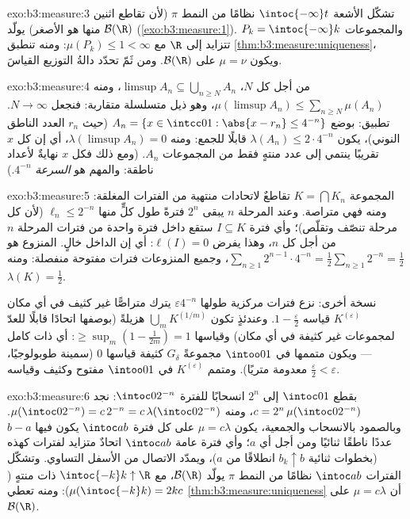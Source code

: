 \begin{solution}{exo:b3:measure:3}
تشكّل الأشعة $\intoc{-\infty}t$ نظامًا من النمط $\pi$ (لأن تقاطع اثنين منها
هو الأصغر) يولّد $\mathcal B(\R)$ (\cref{exo:b3:measure:1}). والمجموعات
$P_k = \intoc{-\infty}k$ تتزايد إلى $\R$ مع $\mu(P_k) \leq 1 < \infty$: ومنه تنطبق \cref{thm:b3:measure:uniqueness}، ويكون
$\mu = \nu$ على $\mathcal B(\R)$. ومن ثَمّ تحدّد دالةُ التوزيع
القياسَ.
\end{solution}

\begin{solution}{exo:b3:measure:4}
من أجل كل $N$، $\limsup A_n \subseteq \bigcup_{n \geq N}A_n$، ومنه $\mu(\limsup A_n) \leq \sum_{n\geq N}\mu(A_n)$، وهو ذيل متسلسلة متقاربة:
فنجعل $N \to \infty$. تطبيق: بوضع
$A_n = \{x \in \intcc01 : \abs{x - r_n} \leq 4^{-n}\}$
(حيث $r_n$ العدد الناطق النوني)، يكون $\lambda(A_n) \leq 2\cdot4^{-n}$ قابلًا للجمع:
ومنه $\lambda(\limsup A_n) = 0$، أي إن كل $x$ تقريبًا ينتمي إلى عدد منتهٍ فقط من
المجموعات $A_n$. (ومع ذلك فكل $x$ نهايةٌ لأعداد ناطقة: والمهم
هو \emph{السرعة} $4^{-n}$.)
\end{solution}

\begin{solution}{exo:b3:measure:5}
المجموعة $K = \bigcap K_n$ تقاطعٌ لاتحادات منتهية من الفترات المغلقة:
ومنه فهي متراصة. وعند المرحلة $n$ يبقى $2^n$ فترةً طول كلٍّ
منها $\ell_n \leq 2^{-n}$ (لأن كل مرحلة تنصّف وتقلّص)؛ وأي فترة
$I \subseteq K$ ستقع داخل فترة واحدة من فترات المرحلة $n$ من
أجل كل $n$، وهذا يفرض $\ell(I) = 0$: أي إن الداخل خالٍ. 
المنزوع هو $\sum_{n\geq1}2^{n-1}\cdot
4^{-n} = \frac12\sum_{n\geq1}2^{-n} = \frac12$، وجميع المنزوعات فترات مفتوحة منفصلة: ومنه
$\lambda(K) = \frac12$.

نسخة أخرى: نزع فترات مركزية طولها $\varepsilon
4^{-n}$ يترك متراصًّا غير كثيف
في أي مكان $K^{(\varepsilon)}$ قياسه $1 - \frac\varepsilon2$. وعندئذٍ تكون $\bigcup_m
K^{(1/m)}$ هزيلةً
(بوصفها اتحادًا قابلًا للعدّ لمجموعات غير كثيفة في أي مكان) وقياسها
$\geq \sup_m(1 - \frac1{2m}) = 1$: أي  ذات  كامل --- ويكون متممها في
$\intoo01$ مجموعةً $G_\delta$ كثيفة قياسها $0$ (سمينة
طوبولوجيًا، معدومة متريًا). ومتمم $K^{(\varepsilon)}$ في $\intoo01$ مفتوح
وكثيف وقياسه $\frac\varepsilon2 < \varepsilon$.
\end{solution}

\begin{solution}{exo:b3:measure:6}
بقطع $\intoc01$ إلى $2^n$ انسحابًا للفترة $\intoc0{2^{-n}}$: نجد $c = 2^n\,\mu(\intoc0{2^{-n}})$،
ومنه $\mu(\intoc0{2^{-n}}) =
c\,2^{-n} = c\,\lambda(\intoc0{2^{-n}})$. وبالصمود بالانسحاب والجمعية، يكون $\mu = c\lambda$
على كل فترة $\intoc ab$ يكون فيها $b - a$ عددًا ناطقًا ثنائيًا
ومن أجل أي $a$؛ وأي فترة عامة $\intoc ab$ اتحادٌ متزايد لفترات
كهذه (بخطوات ثنائية $b_k \uparrow b$ انطلاقًا من $a$)، ويمدّد
الاتصال من الأسفل التساوي. وتشكّل الفترات $\intoc ab$ نظامًا
من النمط $\pi$ يولّد $\mathcal B(\R)$، مع $\intoc{-k}k
\uparrow \R$ ذات  منتهٍ
($\mu(\intoc{-k}k) = 2kc$): ومنه تعطي \cref{thm:b3:measure:uniqueness} أن $\mu = c\lambda$ على
$\mathcal B(\R)$.
\end{solution}

